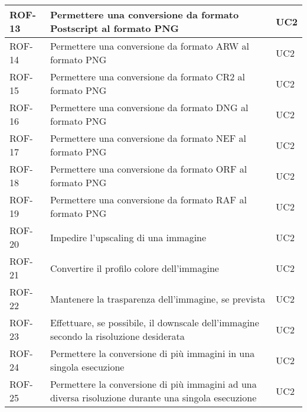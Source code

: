 \begin{table}[H]
\begin{tabularx}{\textwidth}{lXl}
        \hline
        ROF-13             & Permettere una conversione da formato Postscript al formato PNG
                           & UC2
        \\
        \hline
        ROF-14             & Permettere una conversione da formato ARW al formato PNG           & UC2
        \\
        \hline
        ROF-15             & Permettere una conversione da formato CR2 al formato PNG           & UC2
        \\
        \hline
        ROF-16             & Permettere una conversione da formato DNG al formato PNG           & UC2
        \\
        \hline
        ROF-17             & Permettere una conversione da formato NEF al formato PNG           & UC2
        \\
        \hline
        ROF-18             & Permettere una conversione da formato ORF al formato PNG           & UC2
        \\
        \hline
        ROF-19             & Permettere una conversione da formato RAF al formato PNG           & UC2
        \\
        \hline
        ROF-20             & Impedire l'upscaling di una immagine
                           & UC2                                                                                    \\
        \hline
        ROF-21             & Convertire il profilo colore dell'immagine
                           & UC2                                                                                    \\
        \hline
        ROF-22             & Mantenere la trasparenza dell'immagine, se prevista
                           & UC2                                                                                    \\
        \hline
        ROF-23             & Effettuare, se possibile, il downscale
        dell'immagine secondo la risoluzione desiderata
                           & UC2                                                                                    \\
        \hline
        ROF-24             & Permettere la conversione di più immagini in una
        singola esecuzione
                           & UC2
        \\
        \hline
        ROF-25             & Permettere la conversione di più immagini ad una
        diversa risoluzione durante una singola esecuzione
                           & UC2

\end{tabularx}
\end{table}
